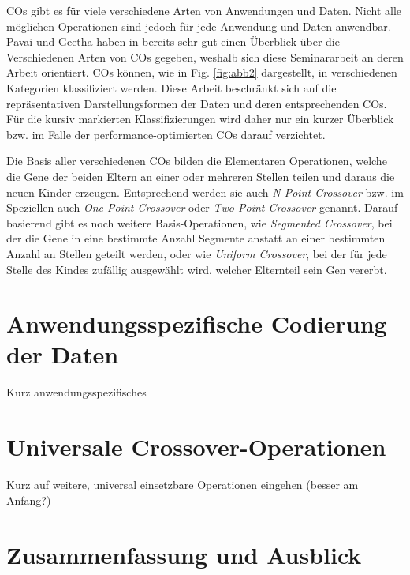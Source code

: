 \documentclass{llncs}
\begin{document}
COs gibt es für viele verschiedene Arten von Anwendungen und Daten. Nicht alle möglichen Operationen sind jedoch für jede Anwendung und Daten anwendbar. Pavai und Geetha haben in \cite{Survey} bereits sehr gut einen Überblick über die Verschiedenen Arten von COs gegeben, weshalb sich diese Seminararbeit an deren Arbeit orientiert. COs können, wie in Fig. \ref{fig:abb2} dargestellt, in verschiedenen Kategorien klassifiziert werden. Diese Arbeit beschränkt sich auf die repräsentativen Darstellungsformen der Daten und deren entsprechenden COs. Für die kursiv markierten Klassifizierungen wird daher nur ein kurzer Überblick bzw. im Falle der performance-optimierten COs darauf verzichtet.

Die Basis aller verschiedenen COs bilden die Elementaren Operationen, wel\-che die Gene der beiden Eltern an einer oder mehreren Stellen teilen und daraus die neuen Kinder erzeugen. Entsprechend werden sie auch \textit{N-Point-Crossover} bzw. im Speziellen auch \textit{One-Point-Crossover} oder \textit{Two-Point-Crossover} ge\-nannt. Darauf basierend gibt es noch weitere Basis-Operationen, wie \textit{Segmented Cross\-over}, bei der die Gene in eine bestimmte Anzahl Segmente anstatt an einer bestimmten Anzahl an Stellen geteilt werden\cite{GABasicIdeas}, oder wie \textit{Uniform Crossover}, bei der für jede Stelle des Kindes zufällig ausgewählt wird, welcher Elternteil sein Gen vererbt.




\section{Anwendungsspezifische Codierung der Daten}
\label{sec:AnwSpezCod}

	Kurz anwendungsspezifisches

\section{Universale Crossover-Operationen}
\label{sec:UnivOp}

	Kurz auf weitere, universal einsetzbare Operationen eingehen (besser am Anfang?)

\section{Zusammenfassung und Ausblick}
\label{sec:ZusFass}
\end{document}
